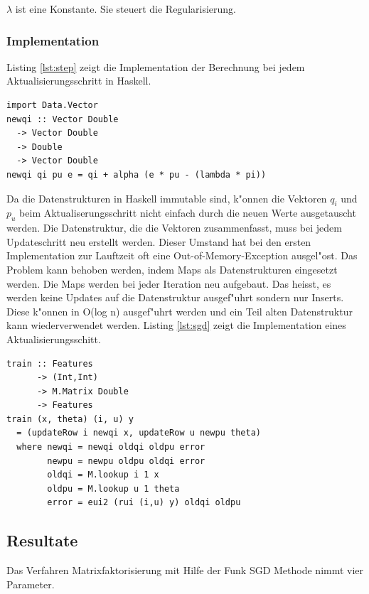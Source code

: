 \documentclass[a4paper, 12pt]{article}
\begin{document}
$\lambda$ ist eine Konstante. Sie steuert die Regularisierung. 

\subsubsection{Implementation}
\label{sec:sgdimpl}

Listing \ref{lst:step} zeigt die Implementation der Berechnung bei jedem Aktualisierungsschritt in Haskell.

\begin{lstlisting}[caption=Berechnung eines Featurevektors, label={lst:step}]
import Data.Vector 
newqi :: Vector Double
  -> Vector Double
  -> Double
  -> Vector Double
newqi qi pu e = qi + alpha (e * pu - (lambda * pi))
\end{lstlisting}

Da die Datenstrukturen in Haskell immutable sind, k"onnen die Vektoren $q_i$ und $p_u$ beim Aktualiserungsschritt nicht einfach durch die neuen Werte ausgetauscht werden. Die Datenstruktur, die die Vektoren zusammenfasst, muss bei jedem Updateschritt neu erstellt werden. Dieser Umstand hat bei den ersten Implementation zur Lauftzeit oft eine Out-of-Memory-Exception ausgel"ost. Das Problem kann behoben werden, indem Maps als Datenstrukturen eingesetzt werden. Die Maps werden bei jeder Iteration neu aufgebaut. Das heisst, es werden keine Updates auf die Datenstruktur ausgef"uhrt sondern nur Inserts. Diese k"onnen in O(log n) ausgef"uhrt werden und ein Teil alten Datenstruktur kann wiederverwendet werden. Listing \ref{lst:sgd} zeigt die Implementation eines Aktualisierungsschitt.

\begin{lstlisting}[caption=Implementation Funk SGD, label=lst:sgd] 
train :: Features
      -> (Int,Int) 
      -> M.Matrix Double 
      -> Features
train (x, theta) (i, u) y
  = (updateRow i newqi x, updateRow u newpu theta)
  where newqi = newqi oldqi oldpu error
        newpu = newpu oldpu oldqi error
        oldqi = M.lookup i 1 x
        oldpu = M.lookup u 1 theta
        error = eui2 (rui (i,u) y) oldqi oldpu  
\end{lstlisting}

\subsection{Resultate}
\label{sec:matrixfactorresults}

Das Verfahren Matrixfaktorisierung mit Hilfe der Funk SGD Methode nimmt vier Parameter.
\end{document}
